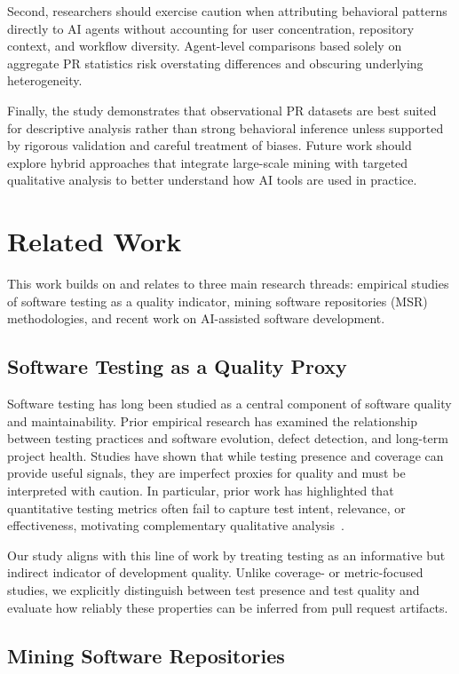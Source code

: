 \documentclass[conference]{IEEEtran}
\begin{document}
Second, researchers should exercise caution when attributing behavioral patterns directly to AI agents without accounting for user concentration, repository context, and workflow diversity. Agent-level comparisons based solely on aggregate PR statistics risk overstating differences and obscuring underlying heterogeneity.

Finally, the study demonstrates that observational PR datasets are best suited for descriptive analysis rather than strong behavioral inference unless supported by rigorous validation and careful treatment of biases. Future work should explore hybrid approaches that integrate large-scale mining with targeted qualitative analysis to better understand how AI tools are used in practice.

\section{Related Work}

This work builds on and relates to three main research threads: empirical studies of software testing as a quality indicator, mining software repositories (MSR) methodologies, and recent work on AI-assisted software development.

\subsection{Software Testing as a Quality Proxy}

Software testing has long been studied as a central component of software quality and maintainability. Prior empirical research has examined the relationship between testing practices and software evolution, defect detection, and long-term project health. Studies have shown that while testing presence and coverage can provide useful signals, they are imperfect proxies for quality and must be interpreted with caution. In particular, prior work has highlighted that quantitative testing metrics often fail to capture test intent, relevance, or effectiveness, motivating complementary qualitative analysis~\cite{inozemtseva2014coverage}.

Our study aligns with this line of work by treating testing as an informative but indirect indicator of development quality. Unlike coverage- or metric-focused studies, we explicitly distinguish between test presence and test quality and evaluate how reliably these properties can be inferred from pull request artifacts.

\subsection{Mining Software Repositories}
\end{document}
